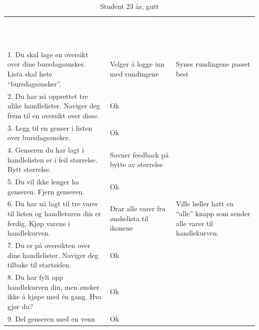 \begin{table}[H]
    \caption{Student 23 år, gutt}
    \label{tab:observasjon2_1}
    \centering
    \begin{tabular}{L{15em}  L{15em} L{15em}}
        \textbf{\textcolor{white}{Task}} & \textbf{\textcolor{white}{Obeservation during execution}} & \textbf{\textcolor{white}{Conversation and discussion}}\\
        1. Du skal lage en oversikt over dine bursdagsønsker. Lista skal hete “bursdagsønsker”. & Velger å logge inn med rundingene          & Synes rundingene passet best\\
        2. Du har nå opprettet tre ulike handlelister. Naviger deg frem til en oversikt over disse. & Ok & \\
        3. Legg til en genser i listen over bursdagsønsker. & Ok & \\ 
        4. Genseren du har lagt i handlelisten er i feil størrelse. Bytt størrelse. & Savner feedback på bytte av størrelse & \\
        5. Du vil ikke lenger ha genseren. Fjern genseren. & Ok & \\
        6. Du har nå lagt til tre varer til listen og handleturen din er ferdig. Kjøp varene i handlekurven. & Drar alle varer fra ønskelista til ikonene & Ville heller hatt en “alle” knapp som sender alle varer til handlekurven. \\
        7. Du er på oversikten over dine handlelister. Naviger deg tilbake til startsiden. & Ok & \\
        8. Du har fylt opp handlekurven din, men ønsker ikke å kjøpe med én gang. Hva gjør du? & Ok & \\
        9. Del genseren med en venn & Ok & \\
    \end{tabular}
\end{table}

